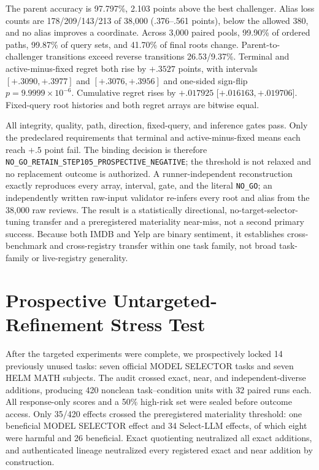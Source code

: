 

The parent accuracy is 97.797\%, 2.103 points above the best challenger. Alias loss counts are 178/209/143/213 of 38,000 (.376--.561 points), below the allowed 380, and no alias improves a coordinate. Across 3,000 paired pools, 99.90\% of ordered paths, 99.87\% of query sets, and 41.70\% of final roots change. Parent-to-challenger transitions exceed reverse transitions 26.53/9.37\%. Terminal and active-minus-fixed regret both rise by $+.3527$ points, with intervals $[+.3090,+.3977]$ and $[+.3076,+.3956]$ and one-sided sign-flip $p=9.9999\times10^{-6}$. Cumulative regret rises by $+.017925$ [$+.016163,+.019706$]. Fixed-query root histories and both regret arrays are bitwise equal.

All integrity, quality, path, direction, fixed-query, and inference gates pass. Only the predeclared requirements that terminal and active-minus-fixed means each reach $+.5$ point fail. The binding decision is therefore \texttt{NO\_GO\_RETAIN\_STEP105\_PROSPECTIVE\_NEGATIVE}; the threshold is not relaxed and no replacement outcome is authorized. A runner-independent reconstruction exactly reproduces every array, interval, gate, and the literal \texttt{NO\_GO}; an independently written raw-input validator re-infers every root and alias from the 38,000 raw reviews. The result is a statistically directional, no-target-selector-tuning transfer and a preregistered materiality near-miss, not a second primary success. Because both IMDB and Yelp are binary sentiment, it establishes cross-benchmark and cross-registry transfer within one task family, not broad task-family or live-registry generality.

\section{Prospective Untargeted-Refinement Stress Test}
\label{app:untargeted}

After the targeted experiments were complete, we prospectively locked 14 previously unused tasks: seven official MODEL SELECTOR tasks and seven HELM MATH subjects. The audit crossed exact, near, and independent-diverse additions, producing 420 nonclean task--condition units with 32 paired runs each. All response-only scores and a 50\% high-risk set were sealed before outcome access. Only 35/420 effects crossed the preregistered materiality threshold: one beneficial MODEL SELECTOR effect and 34 Select-LLM effects, of which eight were harmful and 26 beneficial. Exact quotienting neutralized all exact additions, and authenticated lineage neutralized every registered exact and near addition by construction.

